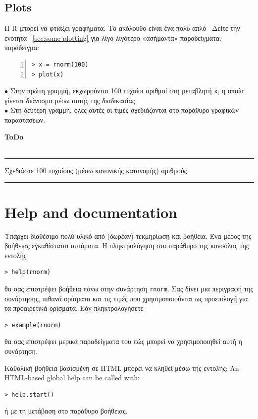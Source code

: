 \documentclass[a4paper,11pt,twocolumn,tablecaptionabove]{scrartcl}
\makeatletter
\newenvironment{ToDo} {%
  \begin{flushright}
    \hfill
    \begin{minipage}{0.95\columnwidth}         %
    \textsf{\textbf{ToDo}} \\
      \vspace{-0.85cm}\\
      {\color{Gray}\rule[-0.1cm]{\columnwidth}{1.5pt}}} { %
      {\color{Gray} \rule[0.3cm]{\columnwidth}{1.5pt}}
    \end{minipage}
    \vspace{1em}
  \end{flushright}
  }
\let\SF@@footnote\footnote
\def\footnote{\ifx\protect\@typeset@protect
 \expandafter\SF@@footnote
 \else
 \expandafter\SF@gobble@opt
 \fi
}
\edef\SF@gobble@opt{\noexpand\protect
 \expandafter\noexpand\csname SF@gobble@opt \endcsname}
\makeatother
\begin{document}
\subsection{Plots}

Η R μπορεί να φτιάξει γραφήματα. Το ακόλουθο είναι ένα πολύ απλό~\footnote{Δείτε την ενότητα
~\ref{sec:some-plotting} για λίγο λιγότερο «ασήμαντα» παραδείγματα.}
παράδειγμα:
\begin{Verbatim}[frame=single,numbers=left,gobble=0, xleftmargin=0.35cm, numbersep=0.1cm]
> x = rnorm(100)
> plot(x)
\end{Verbatim}

\noindent $\bullet$ Στην πρώτη γραμμή, εκχωρούνται 100 τυχαίοι αριθμοί στη μεταβλητή \texttt{x}, η οποία
γίνεται διάνυσμα μέσω αυτής της διαδικασίας. \\
\noindent $\bullet$ Στη δεύτερη γραμμή, όλες αυτές οι τιμές σχεδιάζονται στο παράθυρο γραφικών παραστάσεων.\\

\begin{ToDo}
Σχεδιάστε 100 τυχαίους (μέσω κανονικής κατανομής) αριθμούς.\\
\end{ToDo}


\section{Help and documentation}
\label{sec:help}

Υπάρχει διαθέσιμο πολύ υλικό από (δωρέαν) τεκμηρίωση και βοήθεια. Ένα μέρος της βοήθειας εγκαθίσταται
αυτόματα. Η πληκτρολόγηση στο παράθυρο της κονσόλας της εντολής
\begin{Verbatim}[frame=single,gobble=0]
> help(rnorm)
\end{Verbatim}
θα σας επιστρέψει βοήθεια πάνω στην συνάρτηση \texttt{rnorm}. Σας δίνει μια περιγραφή της συνάρτησης,
πιθανά ορίσματα και τις τιμές που χρησιμοποιούνται ως προεπιλογή για τα προαιρετικά ορίσματα. Εάν
πληκτρολογήσετε
\begin{Verbatim}[frame=single,gobble=0]
> example(rnorm)
\end{Verbatim}
θα σας επιστρέψει μερικά παραδείγματα του πώς μπορεί να χρησιμοποιηθεί αυτή η συνάρτηση.

Καθολική βοήθεια βασισμένη σε HTML μπορεί να κληθεί μέσω της εντολής:
An HTML-based global help can be called with:
\begin{Verbatim}[frame=single,gobble=0]
> help.start()
\end{Verbatim}
ή με τη μετάβαση στο παράθυρο βοήθειας.
\end{document}
